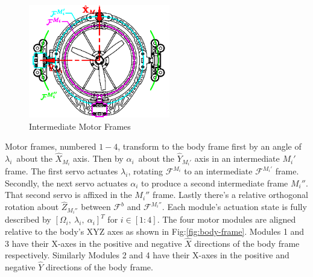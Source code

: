 \begin{minipage}{\textwidth}
\begin{figure}
\centering
\includegraphics[width=0.55\textwidth]{figs/motor-frame}
\caption{Intermediate Motor Frames}
\label{fig:motor-frame}
\end{figure}
Motor frames, numbered $1-4$, transform to the body frame first by an angle of $\lambda_i$\textdegree ~about the $\hat{X}_{M_i}$ axis. Then by $\alpha_i$\textdegree ~about the $\hat{Y}_{M_i'}$ axis in an intermediate $M_i'$ frame. The first servo actuates $\lambda_i$, rotating $\mathcal{F}^{M_i}$ to an intermediate $\mathcal{F}^{M_i'}$ frame. Secondly, the next servo actuates $\alpha_i$ to produce a second intermediate frame $M_i''$. That second servo is affixed in the $M_i''$ frame. Lastly there's a relative orthogonal rotation about $\hat{Z}_{M_i''}$ between $\mathcal{F}^b$ and $\mathcal{F}^{M_i''}$. Each module's actuation state is fully described by $[\Omega_{i},~\lambda_{i},~\alpha_{i}]^{T}$ for $i\in [1:4]$. The four motor modules are aligned relative to the body's XYZ axes as shown in Fig:\ref{fig:body-frame}. Modules 1 and 3 have their X-axes in the positive and negative $\hat{X}$ directions of the body frame respectively. Similarly Modules 2 and 4 have their X-axes in the positive and negative $\hat{Y}$ directions of the body frame.
\end{minipage}
\newpage
